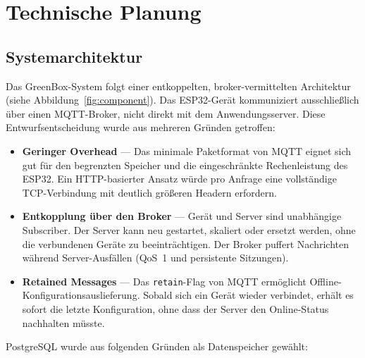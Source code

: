 \documentclass[a4paper,12pt]{article}
\begin{document}
\section{Technische Planung}

\subsection{Systemarchitektur}

Das GreenBox-System folgt einer entkoppelten, broker-vermittelten
Architektur (siehe Abbildung~\ref{fig:component}). Das ESP32-Gerät
kommuniziert ausschließlich über einen MQTT-Broker, nicht direkt mit
dem Anwendungsserver. Diese Entwurfsentscheidung wurde aus mehreren
Gründen getroffen:

\begin{itemize}
  \item \textbf{Geringer Overhead} --- Das minimale Paketformat von
        MQTT eignet sich gut für den begrenzten Speicher und die
        eingeschränkte Rechenleistung des ESP32. Ein HTTP-basierter
        Ansatz würde pro Anfrage eine vollständige TCP-Verbindung mit
        deutlich größeren Headern erfordern.
  \item \textbf{Entkopplung über den Broker} --- Gerät und Server sind
        unabhängige Subscriber. Der Server kann neu gestartet, skaliert
        oder ersetzt werden, ohne die verbundenen Geräte zu
        beeinträchtigen. Der Broker puffert Nachrichten während
        Server-Ausfällen (QoS~1 und persistente Sitzungen).
  \item \textbf{Retained Messages} --- Das \texttt{retain}-Flag von MQTT
        ermöglicht Offline-Konfigurationsauslieferung. Sobald sich ein
        Gerät wieder verbindet, erhält es sofort die letzte Konfiguration,
        ohne dass der Server den Online-Status nachhalten müsste.
\end{itemize}

PostgreSQL wurde aus folgenden Gründen als Datenspeicher gewählt:
\end{document}
